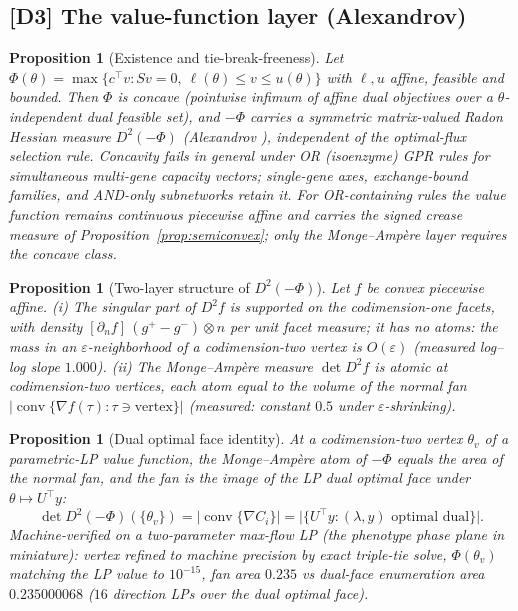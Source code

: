 \documentclass[11pt,a4paper]{article}
\theoremstyle{plain}
\newtheorem{proposition}[theorem]{Proposition}
\theoremstyle{definition}
\theoremstyle{remark}
\begin{document}
\subsection{[D3] The value-function layer (Alexandrov)}

\begin{proposition}[Existence and tie-break-freeness]\label{prop:alex}
Let $\Phi(\theta) = \max\{ c^\top v : Sv = 0,\ \ell(\theta) \le v \le
u(\theta)\}$ with $\ell, u$ affine, feasible and bounded. Then $\Phi$ is
concave (pointwise infimum of affine dual objectives over a
$\theta$-independent dual feasible set), and $-\Phi$ carries a symmetric
matrix-valued Radon Hessian measure $D^2(-\Phi)$ (Alexandrov
\citep{alexandrov1939}), independent
of the optimal-flux selection rule. Concavity fails in general under OR
(isoenzyme) GPR rules for simultaneous multi-gene capacity vectors;
single-gene axes, exchange-bound families, and AND-only subnetworks
retain it. For OR-containing rules the value function remains
continuous piecewise affine and carries the signed crease measure of
Proposition~\ref{prop:semiconvex}; only the Monge--Amp\`ere layer
requires the concave class.
\end{proposition}

\begin{proposition}[Two-layer structure of $D^2(-\Phi)$]\label{prop:twolayer}
Let $f$ be convex piecewise affine. (i) The singular part of $D^2 f$ is
supported on the codimension-one facets, with density
$[\partial_n f]\,(g^+ - g^-) \otimes n$ per unit facet measure; it has no
atoms: the mass in an $\varepsilon$-neighborhood of a codimension-two
vertex is $O(\varepsilon)$ (measured log--log slope $1.000$). (ii) The
Monge--Amp\`ere measure $\det D^2 f$ is atomic at codimension-two
vertices, each atom equal to the volume of the normal fan
$|\operatorname{conv}\{\nabla f(\tau) : \tau \ni \text{vertex}\}|$
(measured: constant $0.5$ under $\varepsilon$-shrinking).
\end{proposition}

\begin{proposition}[Dual optimal face identity]\label{prop:dualface}
At a codimension-two vertex $\theta_v$ of a parametric-LP value function,
the Monge--Amp\`ere atom of $-\Phi$ equals the area of the normal fan, and
the fan is the image of the LP dual optimal face under
$\theta \mapsto U^\top y$:
\[
\det D^2(-\Phi)(\{\theta_v\})
= \bigl|\operatorname{conv}\{\nabla C_i\}\bigr|
= \bigl|\{U^\top y : (\lambda, y) \text{ optimal dual}\}\bigr|.
\]
Machine-verified on a two-parameter max-flow LP (the phenotype phase
plane in miniature): vertex refined to machine precision by exact
triple-tie solve, $\Phi(\theta_v)$ matching the LP value to
$10^{-15}$, fan area $0.235$ vs dual-face enumeration area
$0.235000068$ ($16$ direction LPs over the dual optimal face).
\end{proposition}
\end{document}
